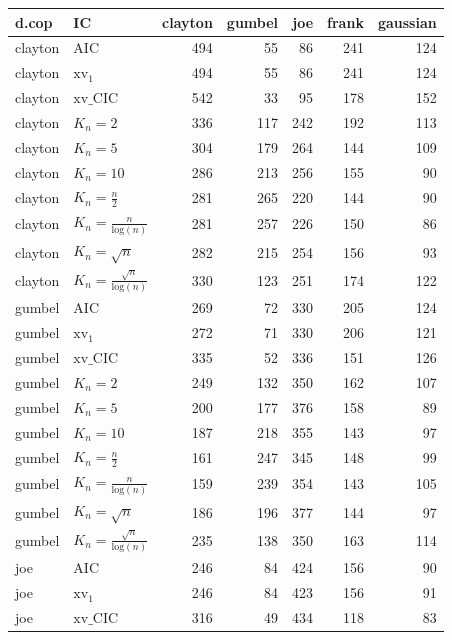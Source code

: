 \begin{table}[htbp]
\centering
\begin{tabular}{llrrrrr}
  \hline
d.cop & IC & clayton & gumbel & joe & frank & gaussian \\ 
  \hline
clayton & AIC & 494 & 55 & 86 & 241 & 124 \\ 
  clayton & $\text{xv}_{1}$ & 494 & 55 & 86 & 241 & 124 \\ 
  clayton & $\text{xv}\_\text{CIC}$ & 542 & 33 & 95 & 178 & 152 \\ 
  clayton & $K_{n}=2$ & 336 & 117 & 242 & 192 & 113 \\ 
  clayton & $K_{n}=5$ & 304 & 179 & 264 & 144 & 109 \\ 
  clayton & $K_{n}=10$ & 286 & 213 & 256 & 155 & 90 \\ 
  clayton & $K_{n}=\tfrac{n}{2}$ & 281 & 265 & 220 & 144 & 90 \\ 
  clayton & $K_{n}=\tfrac{n}{\text{log}(n)}$ & 281 & 257 & 226 & 150 & 86 \\ 
  clayton & $K_{n}=\sqrt{n}$ & 282 & 215 & 254 & 156 & 93 \\ 
  clayton & $K_{n}=\tfrac{\sqrt{n}}{\text{log}(n)}$ & 330 & 123 & 251 & 174 & 122 \\ 
   \hdashline
gumbel & AIC & 269 & 72 & 330 & 205 & 124 \\ 
  gumbel & $\text{xv}_{1}$ & 272 & 71 & 330 & 206 & 121 \\ 
  gumbel & $\text{xv}\_\text{CIC}$ & 335 & 52 & 336 & 151 & 126 \\ 
  gumbel & $K_{n}=2$ & 249 & 132 & 350 & 162 & 107 \\ 
  gumbel & $K_{n}=5$ & 200 & 177 & 376 & 158 & 89 \\ 
  gumbel & $K_{n}=10$ & 187 & 218 & 355 & 143 & 97 \\ 
  gumbel & $K_{n}=\tfrac{n}{2}$ & 161 & 247 & 345 & 148 & 99 \\ 
  gumbel & $K_{n}=\tfrac{n}{\text{log}(n)}$ & 159 & 239 & 354 & 143 & 105 \\ 
  gumbel & $K_{n}=\sqrt{n}$ & 186 & 196 & 377 & 144 & 97 \\ 
  gumbel & $K_{n}=\tfrac{\sqrt{n}}{\text{log}(n)}$ & 235 & 138 & 350 & 163 & 114 \\ 
   \hdashline
joe & AIC & 246 & 84 & 424 & 156 & 90 \\ 
  joe & $\text{xv}_{1}$ & 246 & 84 & 423 & 156 & 91 \\ 
  joe & $\text{xv}\_\text{CIC}$ & 316 & 49 & 434 & 118 & 83 \\ 

\end{tabular}
\end{table}
